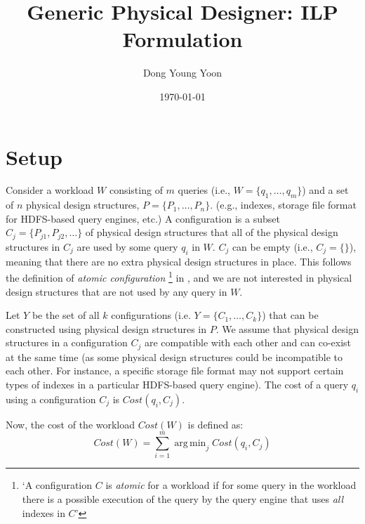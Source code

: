\documentclass[10pt]{article}
\title{Generic Physical Designer: ILP Formulation}
\author{Dong Young Yoon}
\date{\today}
\DeclareMathOperator*{\argmin}{arg\,min}
\newcommand{\dy}[1]{\textcolor{blue}{DY: #1}}
\begin{document}
\maketitle

\section{Setup}
Consider a workload $W$ consisting of $m$ queries (i.e., $W = \{q_1, \dots, q_m\}$) and a set of $n$
physical design structures, $P = \{P_1, \dots, P_n\}$. (e.g., indexes, storage file format for
HDFS-based query engines, etc.)
A configuration is a subset $C_j = \{P_{j1}, P_{j2}, \dots\}$ of physical design structures that
all of the physical design structures in $C_j$ are used by some query $q_i$ in $W$. $C_j$ can be
empty (i.e., $C_j = \{\}$), meaning that there are no extra physical design structures in place.
This follows the definition of \textit{atomic configuration}
\footnote{
`A configuration $C$ is \textit{atomic} for a workload if for some query in the workload
there is a possible execution of the query by the query engine that uses \textit{all} indexes in
$C$'
}
in \cite{chaudhuri1997efficient},
and we are not interested in physical design structures that are not used by any query in $W$.

Let $Y$ be the set of all $k$ configurations (i.e. $Y = \{C_1, \dots, C_k\}$) that can be constructed
using physical design structures in $P$.
We assume that physical design structures in a configuration $C_j$ are compatible with each other
and can co-exist at the same time
(as some physical design structures could be incompatible to each other.
For instance, a specific storage file format may not support certain types of indexes in a
particular HDFS-based query engine).
The cost of a query $q_i$ using a configuration $C_j$ is $Cost(q_i, C_j)$.

Now, the cost of the workload $Cost(W)$ is defined as:
\begin{equation}
  Cost(W) = \sum_{i=1}^{m} \argmin_{j} Cost(q_i, C_j)
  \label{eq:cost}
\end{equation}
\end{document}
